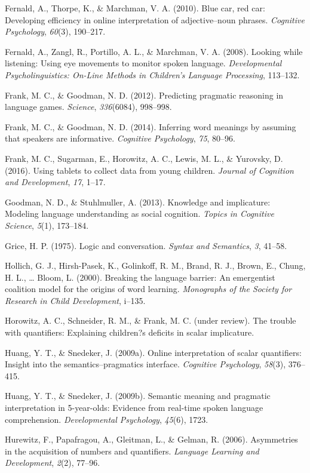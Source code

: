 \documentclass[a4paper,man,apacite,floatsintext]{apa6}
\begin{document}
Fernald, A., Thorpe, K., \& Marchman, V. A. (2010). Blue car, red car:
Developing efficiency in online interpretation of adjective--noun
phrases. \emph{Cognitive Psychology}, \emph{60}(3), 190--217.

Fernald, A., Zangl, R., Portillo, A. L., \& Marchman, V. A. (2008).
Looking while listening: Using eye movements to monitor spoken language.
\emph{Developmental Psycholinguistics: On-Line Methods in Children's
Language Processing}, 113--132.

Frank, M. C., \& Goodman, N. D. (2012). Predicting pragmatic reasoning
in language games. \emph{Science}, \emph{336}(6084), 998--998.

Frank, M. C., \& Goodman, N. D. (2014). Inferring word meanings by
assuming that speakers are informative. \emph{Cognitive Psychology},
\emph{75}, 80--96.

Frank, M. C., Sugarman, E., Horowitz, A. C., Lewis, M. L., \& Yurovsky,
D. (2016). Using tablets to collect data from young children.
\emph{Journal of Cognition and Development}, \emph{17}, 1--17.

Goodman, N. D., \& Stuhlmuller, A. (2013). Knowledge and implicature:
Modeling language understanding as social cognition. \emph{Topics in
Cognitive Science}, \emph{5}(1), 173--184.

Grice, H. P. (1975). Logic and conversation. \emph{Syntax and
Semantics}, \emph{3}, 41--58.

Hollich, G. J., Hirsh-Pasek, K., Golinkoff, R. M., Brand, R. J., Brown,
E., Chung, H. L., \ldots{} Bloom, L. (2000). Breaking the language
barrier: An emergentist coalition model for the origins of word
learning. \emph{Monographs of the Society for Research in Child
Development}, i--135.

Horowitz, A. C., Schneider, R. M., \& Frank, M. C. (under review). The
trouble with quantifiers: Explaining children?s deficits in scalar
implicature.

Huang, Y. T., \& Snedeker, J. (2009a). Online interpretation of scalar
quantifiers: Insight into the semantics--pragmatics interface.
\emph{Cognitive Psychology}, \emph{58}(3), 376--415.

Huang, Y. T., \& Snedeker, J. (2009b). Semantic meaning and pragmatic
interpretation in 5-year-olds: Evidence from real-time spoken language
comprehension. \emph{Developmental Psychology}, \emph{45}(6), 1723.

Hurewitz, F., Papafragou, A., Gleitman, L., \& Gelman, R. (2006).
Asymmetries in the acquisition of numbers and quantifiers.
\emph{Language Learning and Development}, \emph{2}(2), 77--96.
\end{document}
